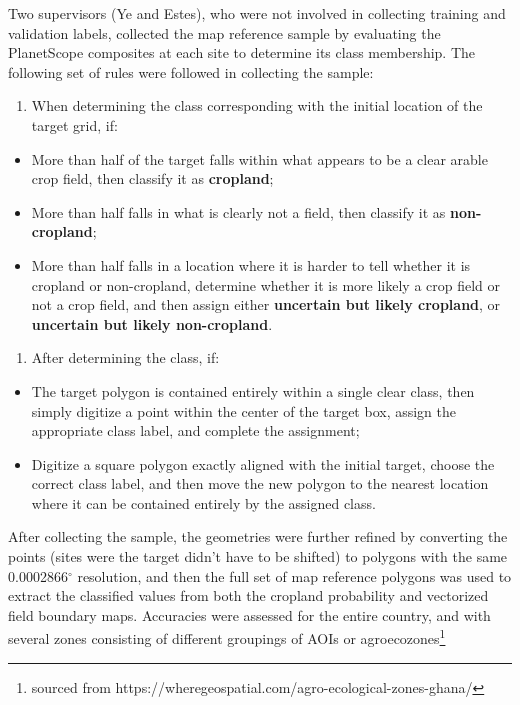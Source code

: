 \documentclass[
  11pt,
  a4paper]{article}
\providecommand{\tightlist}{%
  \setlength{\itemsep}{0pt}\setlength{\parskip}{0pt}}
\begin{document}
Two supervisors (Ye and Estes), who were not involved in collecting
training and validation labels, collected the map reference sample by
evaluating the PlanetScope composites at each site to determine its
class membership. The following set of rules were followed in collecting
the sample:

\begin{enumerate}
\def\labelenumi{\arabic{enumi}.}
\tightlist
\item
  When determining the class corresponding with the initial location of
  the target grid, if:
\end{enumerate}

\begin{itemize}
\tightlist
\item
  More than half of the target falls within what appears to be a clear
  arable crop field, then classify it as \textbf{cropland};
\item
  More than half falls in what is clearly not a field, then classify it
  as \textbf{non-cropland};
\item
  More than half falls in a location where it is harder to tell whether
  it is cropland or non-cropland, determine whether it is more likely a
  crop field or not a crop field, and then assign either
  \textbf{uncertain but likely cropland}, or \textbf{uncertain but
  likely non-cropland}.
\end{itemize}

\begin{enumerate}
\def\labelenumi{\arabic{enumi}.}
\setcounter{enumi}{1}
\tightlist
\item
  After determining the class, if:
\end{enumerate}

\begin{itemize}
\tightlist
\item
  The target polygon is contained entirely within a single clear class,
  then simply digitize a point within the center of the target box,
  assign the appropriate class label, and complete the assignment;
\item
  Digitize a square polygon exactly aligned with the initial target,
  choose the correct class label, and then move the new polygon to the
  nearest location where it can be contained entirely by the assigned
  class.
\end{itemize}

After collecting the sample, the geometries were further refined by
converting the points (sites were the target didn't have to be shifted)
to polygons with the same 0.0002866\(^\circ\) resolution, and then the
full set of map reference polygons was used to extract the classified
values from both the cropland probability and vectorized field boundary
maps. Accuracies were assessed for the entire country, and with several
zones consisting of different groupings of AOIs or
agroecozones\footnote{sourced from https://wheregeospatial.com/agro-ecological-zones-ghana/}
\end{document}
